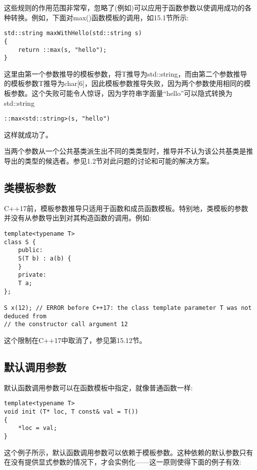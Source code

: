 这些规则的作用范围非常窄，忽略了(例如)可以应用于函数参数以使调用成功的各种转换。例如，下面对max()函数模板的调用，如15.1节所示:

\begin{lstlisting}[style=styleCXX]
std::string maxWithHello(std::string s)
{
	return ::max(s, "hello");
}
\end{lstlisting}

这里由第一个参数推导的模板参数，将T推导为std::string，而由第二个参数推导的模板参数T推导为char[6]，因此模板参数推导失败，因为两个参数使用相同的模板参数。这个失败可能令人惊讶，因为字符串字面量“hello”可以隐式转换为std::string

\begin{lstlisting}[style=styleCXX]
::max<std::string>(s, "hello")
\end{lstlisting}

这样就成功了。

当两个参数从一个公共基类派生出不同的类类型时，推导并不认为该公共基类是推导出的类型的候选者。参见1.2节对此问题的讨论和可能的解决方案。

\subsection{类模板参数}

C++17前，模板参数推导只适用于函数和成员函数模板。特别地，类模板的参数并没有从参数导出到对其构造函数的调用。例如:

\begin{lstlisting}[style=styleCXX]
template<typename T>
class S {
	public:
	S(T b) : a(b) {
	}
	private:
	T a;
};

S x(12); // ERROR before C++17: the class template parameter T was not deduced from
// the constructor call argument 12
\end{lstlisting}

这个限制在C++17中取消了，参见第15.12节。

\subsection{默认调用参数}

默认函数调用参数可以在函数模板中指定，就像普通函数一样:

\begin{lstlisting}[style=styleCXX]
template<typename T>
void init (T* loc, T const& val = T())
{
	*loc = val;
}
\end{lstlisting}

这个例子所示，默认函数调用参数可以依赖于模板参数。这种依赖的默认参数只有在没有提供显式参数的情况下，才会实例化——这一原则使得下面的例子有效:

